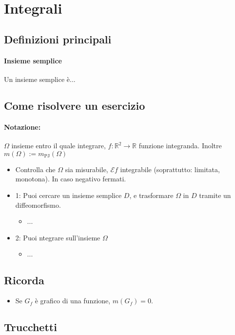 \documentclass[a4paper,10pt]{book}
\begin{document}
\section{Integrali}
\subsection{Definizioni principali}

\paragraph{Insieme semplice}
Un insieme semplice è...

\subsection{Come risolvere un esercizio}
\paragraph{Notazione:}
$\Omega$ insieme entro il quale integrare, $f:\mathbb{R}^2\rightarrow\mathbb{R}$ funzione integranda.
Inoltre $m(\Omega) := m_{\mathrm{PJ}}(\Omega)$
\begin{itemize}
 \item Controlla che $\Omega$ sia misurabile, $\mathcal{E}f$ integrabile (soprattutto: limitata, monotona). In caso negativo fermati.
 \item 1: Puoi cercare un insieme semplice $D$, e trasformare $\Omega$ in $D$ tramite un diffeomorfismo.
 \begin{itemize}
  \item ...
 \end{itemize}
 \item 2: Puoi ntegrare sull'insieme $\Omega$
 \begin{itemize}
  \item ...
 \end{itemize}
\end{itemize}

\subsection{Ricorda}
\begin{itemize}
 \item Se $G_f$ è grafico di una funzione, $m(G_f) = 0$.
\end{itemize}

\subsection{Trucchetti}
\end{document}
